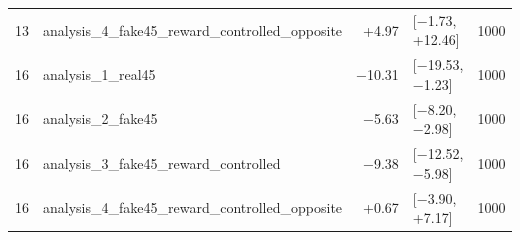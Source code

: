 \begin{table}[htbp]
\begin{tabular}{rlrlr}
    13 & analysis\_4\_fake45\_reward\_controlled\_opposite & +4.97 & [−1.73, +12.46] & 1000 \\
    16 & analysis\_1\_real45 & −10.31 & [−19.53, −1.23] & 1000 \\
    16 & analysis\_2\_fake45 & −5.63 & [−8.20, −2.98] & 1000 \\
    16 & analysis\_3\_fake45\_reward\_controlled & −9.38 & [−12.52, −5.98] & 1000 \\
    16 & analysis\_4\_fake45\_reward\_controlled\_opposite & +0.67 & [−3.90, +7.17] & 1000 \\
    \bottomrule
  \end{tabular}
\end{table}
